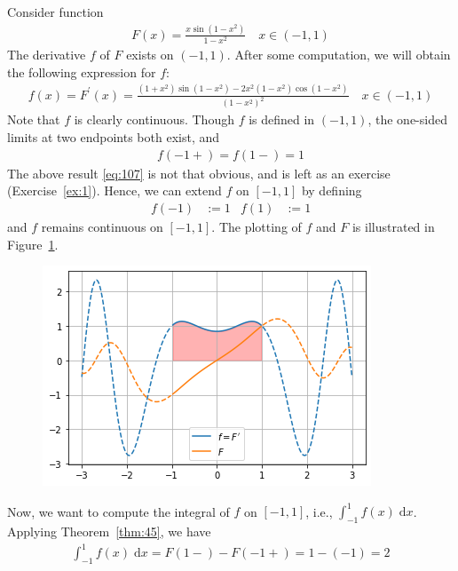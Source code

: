 \documentclass[thmcnt=section, 12pt]{elegantbook}
\begin{document}
\begin{example}
    Consider function 
    \begin{align*}
        F(x) = \frac{x \sin(1 - x^2)}{1 - x^2}
        \quad x \in (-1, 1)
    \end{align*}
    The derivative $f$ of $F$ exists on $(-1, 1)$. After some computation, we will obtain the following expression for $f$:
    \begin{align*}
        f(x) = F^\prime(x)
        = \frac{(1+x^2)\sin(1-x^2) - 2x^2(1-x^2)\cos(1-x^2)}{(1-x^2)^2}
        \quad x \in (-1, 1)
    \end{align*}
    Note that $f$ is clearly continuous. Though $f$ is defined in $(-1, 1)$, the one-sided limits at two endpoints both exist, and 
    \begin{align}
        f(-1+) = f(1-) = 1
        \label{eq:107}
    \end{align}
    The above result \eqref{eq:107} is not that obvious, and is left as an exercise (Exercise~\ref{ex:1}). Hence, we can extend $f$ on $[-1, 1]$ by defining
    \begin{align*}
        f(-1) &:= 1 &
        f(1) &:= 1
    \end{align*}
    and $f$ remains continuous on $[-1, 1]$.
    The plotting of $f$ and $F$ is illustrated in Figure~\ref{fig:1}.

    \begin{figure}[h!]
        \centering
        \includegraphics[scale = 0.7]{figures/reimann-integral-001.png}
        \caption{}
        \label{fig:1}
    \end{figure}

    \par Now, we want to compute the integral of $f$ on $[-1, 1]$, i.e., $\int_{-1}^1 f(x) \; \mathrm{d}x$. Applying Theorem~\ref{thm:45}, we have 
    \begin{align*}
        \int_{-1}^1 f(x) \; \mathrm{d}x
        = F(1-) - F(-1+)
        = 1 - (-1)
        =2
    \end{align*}

\end{example}
\end{document}

